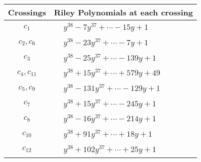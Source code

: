 \documentclass[1p]{elsarticle_modified}
\theoremstyle{definition}
\begin{document}
\begin{tabular}{m{50pt}|m{274pt}}
Crossings & \hspace{64pt}Riley Polynomials at each crossing \\
\hline $$\begin{aligned}c_{1}\end{aligned}$$&$\begin{aligned}
&y^{38}-7 y^{37}+\cdots-15 y+1
\end{aligned}$\\
\hline $$\begin{aligned}c_{2},c_{6}\end{aligned}$$&$\begin{aligned}
&y^{38}-23 y^{37}+\cdots-7 y+1
\end{aligned}$\\
\hline $$\begin{aligned}c_{3}\end{aligned}$$&$\begin{aligned}
&y^{38}-25 y^{37}+\cdots-139 y+1
\end{aligned}$\\
\hline $$\begin{aligned}c_{4},c_{11}\end{aligned}$$&$\begin{aligned}
&y^{38}+15 y^{37}+\cdots+579 y+49
\end{aligned}$\\
\hline $$\begin{aligned}c_{5},c_{9}\end{aligned}$$&$\begin{aligned}
&y^{38}-131 y^{37}+\cdots-129 y+1
\end{aligned}$\\
\hline $$\begin{aligned}c_{7}\end{aligned}$$&$\begin{aligned}
&y^{38}+15 y^{37}+\cdots-245 y+1
\end{aligned}$\\
\hline $$\begin{aligned}c_{8}\end{aligned}$$&$\begin{aligned}
&y^{38}-16 y^{37}+\cdots-214 y+1
\end{aligned}$\\
\hline $$\begin{aligned}c_{10}\end{aligned}$$&$\begin{aligned}
&y^{38}+91 y^{37}+\cdots+18 y+1
\end{aligned}$\\
\hline $$\begin{aligned}c_{12}\end{aligned}$$&$\begin{aligned}
&y^{38}+102 y^{37}+\cdots+25 y+1
\end{aligned}$\\
\hline
\end{tabular}\\~\\
\end{document}
